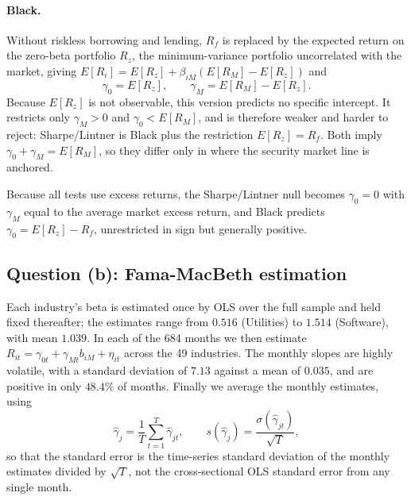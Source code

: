 \paragraph{Black.} Without riskless borrowing and lending, $R_f$ is replaced by
the expected return on the zero-beta portfolio $R_z$, the minimum-variance
portfolio uncorrelated with the market, giving
$E[R_i] = E[R_z] + \beta_{iM}(E[R_M] - E[R_z])$ and
\[
\gamma_0 = E[R_z], \qquad \gamma_M = E[R_M] - E[R_z] .
\]
Because $E[R_z]$ is not observable, this version predicts no specific
intercept. It restricts only $\gamma_M > 0$ and $\gamma_0 < E[R_M]$, and is
therefore weaker and harder to reject: Sharpe\slash Lintner is Black plus the
restriction $E[R_z] = R_f$. Both imply $\gamma_0 + \gamma_M = E[R_M]$, so they
differ only in where the security market line is anchored.

Because all tests use excess returns, the Sharpe\slash Lintner null becomes
$\gamma_0 = 0$ with $\gamma_M$ equal to the average market excess return, and
Black predicts $\gamma_0 = E[R_z] - R_f$, unrestricted in sign but generally
positive.

\subsection{Question (b): Fama-MacBeth estimation}

Each industry's beta is estimated once by OLS over the full sample and held
fixed thereafter; the estimates range from $0.516$ (Utilities) to $1.514$
(Software), with mean $1.039$. In each of the 684 months we then estimate
$R_{it} = \gamma_{0t} + \gamma_{Mt} b_{iM} + \eta_{it}$ across the 49
industries. The monthly slopes are highly volatile, with a standard deviation
of $7.13$ against a mean of $0.035$, and are positive in only $48.4\%$ of
months. Finally we average the monthly estimates, using
\[
\hat\gamma_j = \frac{1}{T}\sum_{t=1}^{T}\hat\gamma_{jt},
\qquad
s(\hat\gamma_j) = \frac{\sigma(\hat\gamma_{jt})}{\sqrt{T}},
\]
so that the standard error is the time-series standard deviation of the monthly
estimates divided by $\sqrt{T}$, not the cross-sectional OLS standard error
from any single month.

